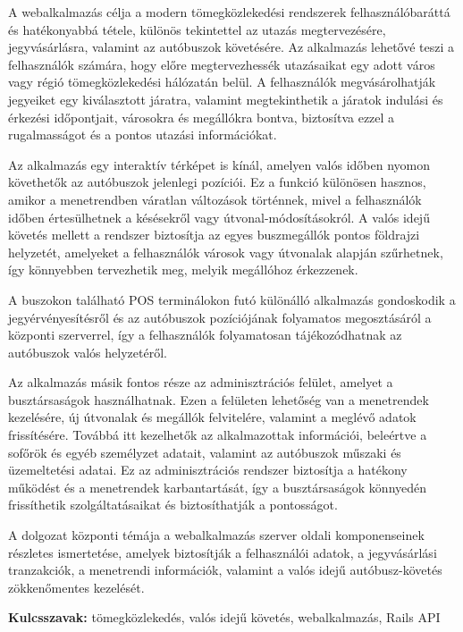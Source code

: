 
A webalkalmazás célja a modern tömegközlekedési rendszerek felhasználóbaráttá és hatékonyabbá tétele, különös tekintettel az utazás megtervezésére, jegyvásárlásra, valamint az autóbuszok követésére. Az alkalmazás lehetővé teszi a felhasználók számára, hogy előre megtervezhessék utazásaikat egy adott város vagy régió tömegközlekedési hálózatán belül. A felhasználók megvásárolhatják jegyeiket egy kiválasztott járatra, valamint megtekinthetik a járatok indulási és érkezési időpontjait, városokra és megállókra bontva, biztosítva ezzel a rugalmasságot és a pontos utazási információkat.

Az alkalmazás egy interaktív térképet is kínál, amelyen valós időben nyomon követhetők az autóbuszok jelenlegi pozíciói. Ez a funkció különösen hasznos, amikor a menetrendben váratlan változások történnek, mivel a felhasználók időben értesülhetnek a késésekről vagy útvonal-módosításokról. A valós idejű követés mellett a rendszer biztosítja az egyes buszmegállók pontos földrajzi helyzetét, amelyeket a felhasználók városok vagy útvonalak alapján szűrhetnek, így könnyebben tervezhetik meg, melyik megállóhoz érkezzenek.

A buszokon található POS terminálokon futó különálló alkalmazás gondoskodik a jegyérvényesítésről és az autóbuszok pozíciójának folyamatos megosztásáról a központi szerverrel, így a felhasználók folyamatosan tájékozódhatnak az autóbuszok valós helyzetéről.

Az alkalmazás másik fontos része az adminisztrációs felület, amelyet a busztársaságok használhatnak. Ezen a felületen lehetőség van a menetrendek kezelésére, új útvonalak és megállók felvitelére, valamint a meglévő adatok frissítésére. Továbbá itt kezelhetők az alkalmazottak információi, beleértve a sofőrök és egyéb személyzet adatait, valamint az autóbuszok műszaki és üzemeltetési adatai. Ez az adminisztrációs rendszer biztosítja a hatékony működést és a menetrendek karbantartását, így a busztársaságok könnyedén frissíthetik szolgáltatásaikat és biztosíthatják a pontosságot.

A dolgozat központi témája a webalkalmazás szerver oldali komponenseinek részletes ismertetése, amelyek biztosítják a felhasználói adatok, a jegyvásárlási tranzakciók, a menetrendi információk, valamint a valós idejű autóbusz-követés zökkenőmentes kezelését.

\vspace{1em}
\textbf{Kulcsszavak:} tömegközlekedés, valós idejű követés, webalkalmazás, Rails API